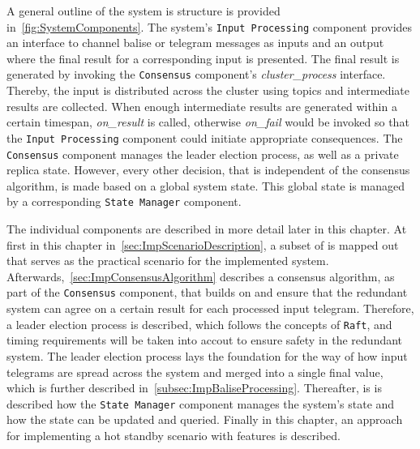 A general outline of the system is structure is provided in~\autoref{fig:SystemComponents}.
The system's \texttt{Input Processing} component provides an interface to channel balise or  telegram messages as inputs and an output where the final result for a corresponding input is presented.
The final result is generated by invoking the \texttt{Consensus} component's \textit{cluster\_process} interface.
Thereby, the input is distributed across the cluster using  topics and intermediate results are collected.
When enough intermediate results are generated within a certain timespan, \textit{on\_result} is called, otherwise \textit{on\_fail} would be invoked so that the \texttt{Input Processing} component could initiate appropriate consequences.
The \texttt{Consensus} component manages the leader election process, as well as a private replica state.
However, every other decision, that is independent of the consensus algorithm, is made based on a global system state.
This global state is managed by a corresponding \texttt{State Manager} component.

The individual components are described in more detail later in this chapter.
At first in this chapter in~\autoref{sec:ImpScenarioDescription}, a subset of  is mapped out that serves as the practical scenario for the implemented system.
Afterwards,~\autoref{sec:ImpConsensusAlgorithm} describes a consensus algorithm, as part of the \texttt{Consensus} component, that builds on  and ensure that the redundant system can agree on a certain result for each processed input telegram.
Therefore, a leader election process is described, which follows the concepts of \texttt{Raft}, and timing requirements will be taken into accout to ensure safety in the redundant system.
The leader election process lays the foundation for the way of how input telegrams are spread across the system and merged into a single final value, which is further described in~\autoref{subsec:ImpBaliseProcessing}.
Thereafter, is is described how the \texttt{State Manager} component manages the system's state and how the state can be updated and queried.
Finally in this chapter, an approach for implementing a hot standby scenario with  features is described.

